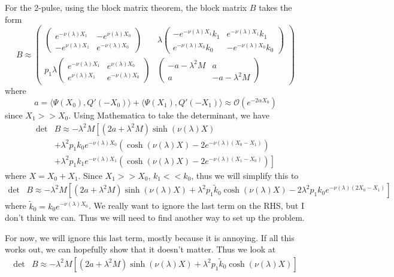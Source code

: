 \documentclass[thesis.tex]{subfiles}
\begin{document}
For the 2-pulse, using the block matrix theorem, the block matrix $B$ takes the form
\[
B \approx \begin{pmatrix}
\begin{pmatrix}
e^{-\nu(\lambda)X_1} & -e^{\nu(\lambda)X_0} \\
-e^{\nu(\lambda)X_1} & e^{-\nu(\lambda)X_0} 
\end{pmatrix} &
\lambda \begin{pmatrix}
-e^{-\nu(\lambda)X_1} k_1 & e^{-\nu(\lambda)X_1} k_1 \\ e^{-\nu(\lambda)X_0} k_0 & -e^{-\nu(\lambda)X_0} k_0
\end{pmatrix} \\
p_1 \lambda
\begin{pmatrix}
e^{-\nu(\lambda)X_1} & e^{\nu(\lambda)X_0} \\
e^{\nu(\lambda)X_1} & e^{-\nu(\lambda)X_0} 
\end{pmatrix} &
\begin{pmatrix}
-a - \lambda^2 M & a \\
a & -a - \lambda^2 M
\end{pmatrix}
\end{pmatrix}
\]
where
\[
a = \langle \Psi(X_0), Q'(-X_0) \rangle
+ \langle \Psi(X_1), Q'(-X_1) \rangle \approx \mathcal{O}(e^{-2\alpha X_0})
\]
since $X_1 >> X_0$. Using Mathematica to take the determinant, we have
\begin{align*}
\det &B \approx -\lambda^2 M \left[ (2a + \lambda^2 M) \sinh(\nu(\lambda)X) \right. \\
&+ \left. \lambda^2 p_1 k_0 e^{-\nu(\lambda) X_0}\left( \cosh (\nu(\lambda) X) - 2 e^{-\nu(\lambda) (X_0 - X_1) } \right) \right. \\
&+ \left. \lambda^2 p_1 k_1 e^{-\nu(\lambda) X_1}\left( \cosh (\nu(\lambda) X) - 2 e^{-\nu(\lambda) (X_1 - X_0) } \right) \right] 
\end{align*}
where $X = X_0 + X_1$. Since $X_1 >> X_0$, $k_1 << k_0$, thus we will simplify this to 
\begin{align*}
\det &B \approx -\lambda^2 M \left[ (2a + \lambda^2 M) \sinh(\nu(\lambda)X) + \lambda^2 p_1 \tilde{k}_0 \cosh (\nu(\lambda) X) - 2 \lambda^2 p_1 k_0 e^{-\nu(\lambda) (2 X_0 - X_1) } \right] 
\end{align*}
where $\tilde{k}_0 = k_0 e^{-\nu(\lambda) X_0}$. We really want to ignore the last term on the RHS, but I don't think we can. Thus we will need to find another way to set up the problem.

For now, we will ignore this last term, mostly because it is annoying. If all this works out, we can hopefully show that it doesn't matter. Thus we look at 
\begin{align*}
\det &B \approx -\lambda^2 M \left[ (2a + \lambda^2 M) \sinh(\nu(\lambda)X) + \lambda^2 p_1 \tilde{k}_0 \cosh (\nu(\lambda) X) \right] 
\end{align*}
\end{document}
